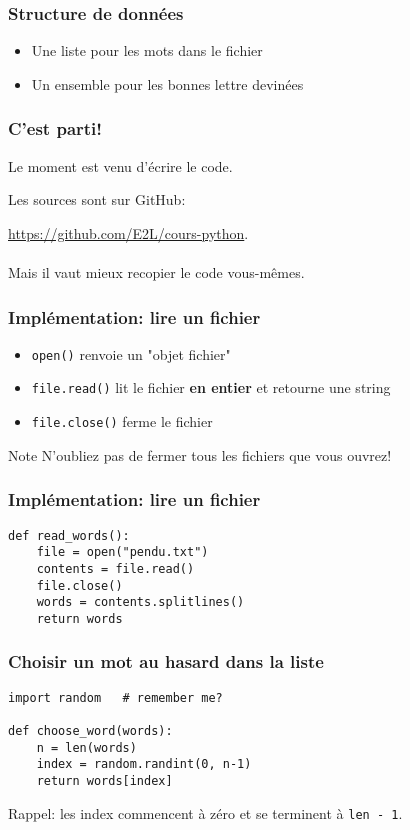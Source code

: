 \documentclass{beamer}
\begin{document}
\begin{frame}[fragile]
  \frametitle{Structure de données}
\begin{itemize}
  \item Une liste pour les mots dans le fichier
  \item Un ensemble pour les bonnes lettre devinées
\end{itemize}
\end{frame}


\begin{frame}[fragile]
  \frametitle{C'est parti!}

Le moment est venu d'écrire le code.

Les sources sont sur GitHub:

\url{https://github.com/E2L/cours-python}. \\~\\

Mais il vaut mieux recopier le code vous-mêmes.

\end{frame}


\begin{frame}[fragile]
  \frametitle{Implémentation: lire un fichier}

\begin{itemize}
  \item \texttt{open()} renvoie un "objet fichier"
  \item \texttt{file.read()} lit le fichier \textbf{en entier} et retourne une string
  \item \texttt{file.close()} ferme le fichier
\end{itemize}

\begin{alertblock}{Note}
  N'oubliez pas de fermer tous les fichiers que vous ouvrez!
\end{alertblock}
\end{frame}

\begin{frame}[fragile]
  \frametitle{Implémentation: lire un fichier}

\begin{lstlisting}
def read_words():
    file = open("pendu.txt")
    contents = file.read()
    file.close()
    words = contents.splitlines()
    return words
\end{lstlisting}

\end{frame}

\begin{frame}[fragile]
  \frametitle{Choisir un mot au hasard dans la liste}
\begin{lstlisting}
import random   # remember me?

def choose_word(words):
    n = len(words)
    index = random.randint(0, n-1)
    return words[index]
\end{lstlisting}

Rappel: les index commencent à zéro et se terminent à \texttt{len - 1}.

\end{frame}
\end{document}
